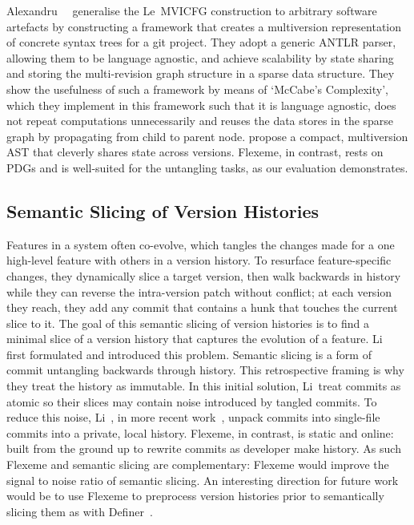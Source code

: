Alexandru~\etal~\citep{alexandru2019redundancy} generalise the Le~\etal MVICFG
construction to arbitrary software artefacts by constructing a framework that
creates a multiversion representation of concrete syntax trees for a git
project. They adopt a generic ANTLR parser, allowing them to be language
agnostic, and achieve scalability by state sharing and storing the
multi-revision graph structure in a sparse data structure. They show the
usefulness of such a framework by means of `McCabe’s Complexity', which they
implement in this framework such that it is language agnostic, does not repeat
computations unnecessarily and reuses the data stores in the sparse graph by
propagating from child to parent node. \citet{Sebastian2018} propose a compact,
multiversion AST that cleverly shares state across versions. Flexeme, in
contrast, rests on PDGs and is well-suited for the untangling tasks, as our
evaluation demonstrates.

\subsection{Semantic Slicing of Version Histories}
\label{chapter:literature:sec:flexeme_rel_work:sem_slice_vh}

Features in a system often co-evolve, which tangles the changes made for a one
high-level feature with others in a version history. To resurface
feature-specific changes, they dynamically slice a target version, then walk
backwards in history while they can reverse the intra-version patch without
conflict; at each version they reach, they add any commit that contains a hunk
that touches the current slice to it. The goal of this semantic slicing of
version histories is to find a minimal slice of a version history that captures
the evolution of a feature. Li~\etal~\cite{Li2018, li2015semantic} first
formulated and introduced this problem. Semantic slicing is a form of commit
untangling backwards through history.  This retrospective framing is why they
treat the history as immutable. In this initial solution, Li~\etal treat commits
as atomic so their slices may contain noise introduced by tangled commits. To
reduce this noise, Li~\etal, in more recent work~\cite{Li2019}, unpack commits
into single-file commits into a private, local history. Flexeme, in contrast, is
static and online:  built from the ground up to rewrite commits as developer
make history.  
As such Flexeme and semantic slicing are complementary:  Flexeme would improve
the signal to noise ratio of semantic slicing. An interesting direction for
future work would be to use Flexeme to preprocess version histories prior to
semantically slicing them as with Definer~\cite{Li2019}.

